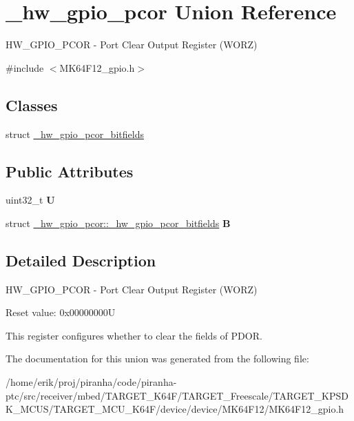 \hypertarget{union__hw__gpio__pcor}{}\section{\+\_\+hw\+\_\+gpio\+\_\+pcor Union Reference}
\label{union__hw__gpio__pcor}


H\+W\+\_\+\+G\+P\+I\+O\+\_\+\+P\+C\+OR -\/ Port Clear Output Register (W\+O\+RZ)  




{\ttfamily \#include $<$M\+K64\+F12\+\_\+gpio.\+h$>$}

\subsection*{Classes}
\begin{DoxyCompactItemize}
\item 
struct \hyperlink{struct__hw__gpio__pcor_1_1__hw__gpio__pcor__bitfields}{\+\_\+hw\+\_\+gpio\+\_\+pcor\+\_\+bitfields}
\end{DoxyCompactItemize}
\subsection*{Public Attributes}
\begin{DoxyCompactItemize}
\item 
uint32\+\_\+t {\bfseries U}\hypertarget{union__hw__gpio__pcor_a4c58d2af2e04322a0f855b5234f904f8}{}\label{union__hw__gpio__pcor_a4c58d2af2e04322a0f855b5234f904f8}

\item 
struct \hyperlink{struct__hw__gpio__pcor_1_1__hw__gpio__pcor__bitfields}{\+\_\+hw\+\_\+gpio\+\_\+pcor\+::\+\_\+hw\+\_\+gpio\+\_\+pcor\+\_\+bitfields} {\bfseries B}\hypertarget{union__hw__gpio__pcor_a14abb66de1dc74468ce6ce0eceb085c3}{}\label{union__hw__gpio__pcor_a14abb66de1dc74468ce6ce0eceb085c3}

\end{DoxyCompactItemize}


\subsection{Detailed Description}
H\+W\+\_\+\+G\+P\+I\+O\+\_\+\+P\+C\+OR -\/ Port Clear Output Register (W\+O\+RZ) 

Reset value\+: 0x00000000U

This register configures whether to clear the fields of P\+D\+OR. 

The documentation for this union was generated from the following file\+:\begin{DoxyCompactItemize}
\item 
/home/erik/proj/piranha/code/piranha-\/ptc/src/receiver/mbed/\+T\+A\+R\+G\+E\+T\+\_\+\+K64\+F/\+T\+A\+R\+G\+E\+T\+\_\+\+Freescale/\+T\+A\+R\+G\+E\+T\+\_\+\+K\+P\+S\+D\+K\+\_\+\+M\+C\+U\+S/\+T\+A\+R\+G\+E\+T\+\_\+\+M\+C\+U\+\_\+\+K64\+F/device/device/\+M\+K64\+F12/M\+K64\+F12\+\_\+gpio.\+h\end{DoxyCompactItemize}
